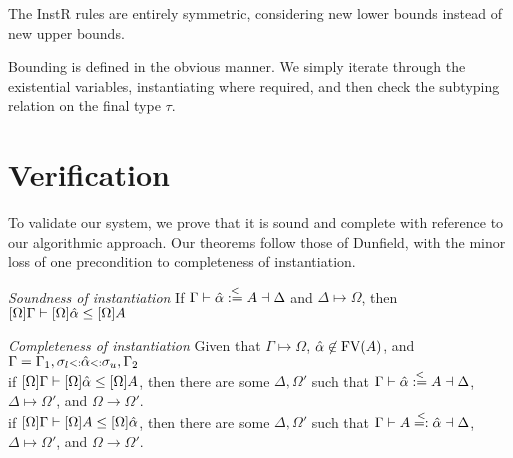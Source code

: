 \documentclass{sig-alternate}
\begin{document}
The InstR rules are entirely symmetric, considering new lower bounds instead of new upper bounds.
 

Bounding is defined in the obvious manner. We simply iterate through the existential variables, instantiating where required, and then check the subtyping relation on the final type $\tau$.


\section{Verification}





To validate our system, we prove that it is sound and complete with reference to our algorithmic approach. Our theorems follow those of Dunfield, with the minor loss of one precondition to completeness of instantiation.

\emph{Soundness of instantiation} If $\Gamma \vdash \hat{\alpha}\overset{<}{:=} A \dashv\Delta$ and $\Delta \mapsto \Omega$, then $[\Omega]\Gamma \vdash [\Omega]\hat{\alpha} \leq [\Omega]A$

\emph{Completeness of instantiation} 
Given that $\Gamma \longmapsto \Omega$, $\hat{\alpha}\not\in \text{FV}(A)$, and $\Gamma = \Gamma_1,\sigma_l {\scriptstyle{<:}} \hat{\alpha} {\scriptstyle{<:}} \sigma_u,\Gamma_2$\\
if $[\Omega]\Gamma\vdash [\Omega]\hat{\alpha} \leq [\Omega]A$, then there are some $\Delta,\Omega'$ such that $\Gamma \vdash \hat{\alpha} \overset{<}{:=} A \dashv \Delta$, $\Delta \longmapsto \Omega'$, and $\Omega \longrightarrow \Omega'$.\\
if $[\Omega]\Gamma\vdash [\Omega]A \leq [\Omega]\hat{\alpha}$, then there are some $\Delta,\Omega'$ such that $\Gamma \vdash A \overset{<}{=:} \hat{\alpha} \dashv \Delta$, $\Delta \longmapsto \Omega'$, and $\Omega \longrightarrow \Omega'$.
\end{document}
